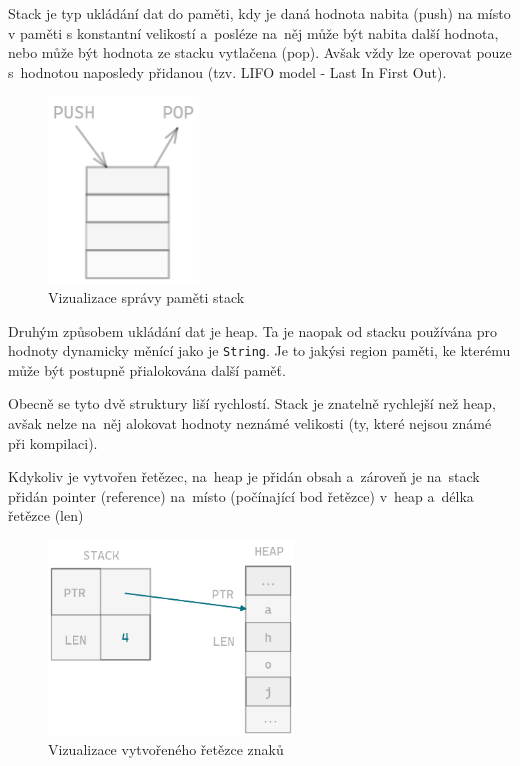 \documentclass[a4paper, 12pt, twoside]{article} %
\begin{document}
				Stack je typ ukládání dat do paměti, kdy je daná hodnota nabita (push) na místo v paměti s konstantní velikostí  a~posléze na~něj může být nabita další hodnota, nebo může být hodnota ze stacku vytlačena (pop). Avšak vždy lze operovat pouze s~hodnotou naposledy přidanou (tzv. LIFO model - Last In First Out).
				\begin{center}
					\begin{figure}[H]
						\centering
						\includegraphics[width=4cm]{stack}
						\caption{Vizualizace správy paměti stack}
						\label{fig:my_label_2}
					\end{figure}
				\end{center}
	
				Druhým způsobem ukládání dat je heap. Ta je naopak od stacku používána pro hodnoty dynamicky měnící jako je \texttt{String}. Je to jakýsi region paměti, ke kterému může být postupně přialokována další paměť.
					
				Obecně se tyto dvě struktury liší rychlostí. Stack je znatelně rychlejší než heap, avšak nelze na~něj alokovat hodnoty neznámé velikosti (ty, které nejsou známé při kompilaci).
	
				Kdykoliv je vytvořen řetězec, na~heap je přidán obsah a~zároveň je na~stack přidán pointer (reference) na~místo (počínající bod řetězce) v~heap a~délka řetězce (len)
					
				\begin{center}
					\begin{figure}[H]
						\centering
						\includegraphics[width=6.5cm]{string_heap}
						\caption{Vizualizace vytvořeného řetězce znaků}
						\label{fig:my_label_3}
					\end{figure}
				\end{center}
					
\end{document}

